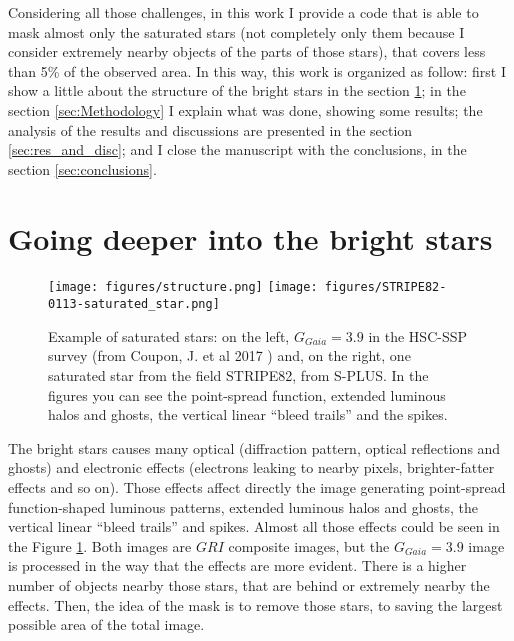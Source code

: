 \documentclass{article}
\begin{document}
Considering all those challenges, in this work I provide a code that is able to mask almost only the saturated stars (not completely only them because I consider extremely nearby objects of the parts of those stars), that covers less than 5\% of the observed area. In this way, this work is organized as follow: first I show a little about the structure of the bright stars in the section \ref{sec:more}; in the section \ref{sec:Methodology} I explain what was done, showing some results; the analysis of the results and discussions are presented in the section \ref{sec:res_and_disc}; and I close the manuscript with the conclusions, in the section \ref{sec:conclusions}.

\section{Going deeper into the bright stars}
\label{sec:more}

\begin{figure}[h!]
  \centering
  \texttt{[image: figures/structure.png]}
  \texttt{[image: figures/STRIPE82-0113-saturated\_star.png]}
  \caption{Example of saturated stars: on the left, $G_{Gaia} = 3.9$ in the HSC-SSP survey (from Coupon, J. et al 2017 \cite{Coupon2017}) and, on the right, one saturated star from the field STRIPE82, from S-PLUS. In the figures you can see the point-spread function, extended luminous halos and ghosts, the vertical linear ``bleed trails'' and the spikes.}
  \label{fig:examples}
\end{figure}

The bright stars causes many optical (diffraction pattern, optical reflections and ghosts) and electronic effects (electrons leaking to nearby pixels, brighter-fatter effects and so on). Those effects affect directly the image generating point-spread function-shaped luminous patterns, extended luminous halos and ghosts, the vertical linear ``bleed trails'' and spikes. Almost all those effects could be seen in the Figure \ref{fig:examples}. Both images are $GRI$ composite images, but the $G_{Gaia} = 3.9$ image is processed in the way that the effects are more evident. There is a higher number of objects nearby those stars, that are behind or extremely nearby the effects. Then, the idea of the mask is to remove those stars, to saving the largest possible area of the total image.


\end{document}
